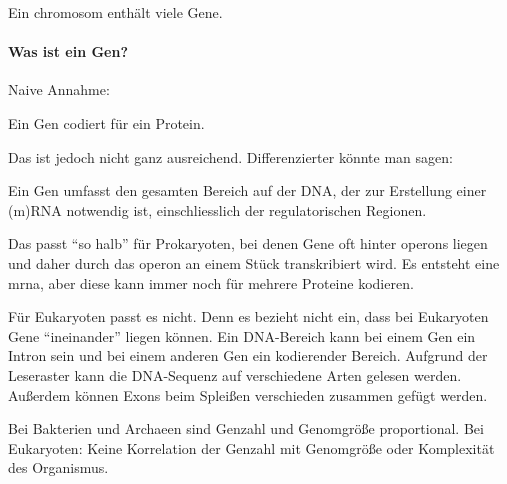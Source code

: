 
Ein \gls{chromosom} enthält viele Gene.

\paragraph{Was ist ein Gen?}
Naive Annahme:
\begin{center}
    Ein Gen codiert für ein Protein.
\end{center}
Das ist jedoch nicht ganz ausreichend.
Differenzierter könnte man sagen:
\begin{center}
    Ein Gen umfasst den gesamten Bereich auf der DNA, der zur Erstellung
    einer (m)RNA notwendig ist, einschliesslich der regulatorischen Regionen.
\end{center}
Das passt ``so halb'' für Prokaryoten, bei denen Gene oft hinter \gls{operon}s liegen und daher durch das
\gls{operon} an
einem
Stück transkribiert wird.
Es entsteht eine \gls{mrna}, aber diese kann immer noch für mehrere Proteine kodieren.

Für Eukaryoten passt es nicht.
Denn es bezieht nicht ein, dass bei Eukaryoten Gene ``ineinander'' liegen können.
Ein DNA-Bereich kann bei einem Gen ein Intron sein und bei einem anderen Gen ein kodierender Bereich.
Aufgrund der Leseraster kann die DNA-Sequenz auf verschiedene Arten gelesen werden.
Außerdem können Exons beim Spleißen verschieden zusammen gefügt werden.


\begin{bem}
    Bei Bakterien und Archaeen sind
    Genzahl und Genomgröße proportional.
    Bei Eukaryoten:
    Keine Korrelation der Genzahl mit Genomgröße oder Komplexität des Organismus.
\end{bem}


